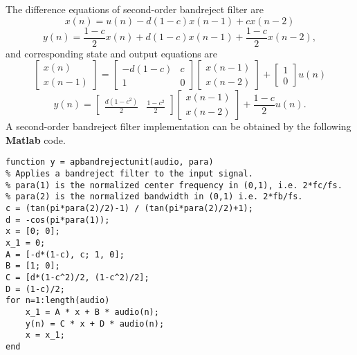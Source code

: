 \documentclass[10pt,a4paper,oneside]{article}
\begin{document}
The difference equations of second-order bandreject filter are
\[
x(n) = u(n) - d(1-c)x(n-1) + cx(n-2)
\]
\[
y(n) = \frac{1-c}{2}x(n) + d(1-c)x(n-1) + \frac{1-c}{2}x(n-2),
\]
and corresponding state and output equations are
\[
\begin{bmatrix}x(n)\\x(n-1)\end{bmatrix} = \begin{bmatrix}
-d(1-c)&c\\
1&0
\end{bmatrix}
\begin{bmatrix}x(n-1)\\x(n-2)\end{bmatrix} + \begin{bmatrix}1\\0\end{bmatrix}
u(n)\]
\[
y(n) = \begin{bmatrix}\frac{d(1-c^2)}{2}&\frac{1-c^2}{2}\end{bmatrix}
\begin{bmatrix}x(n-1)\\x(n-2)\end{bmatrix} + \frac{1-c}{2}u(n).
\]
A second-order bandreject filter implementation can be obtained by the following {\bfseries Matlab} code.
\begin{lstlisting}
function y = apbandrejectunit(audio, para)
% Applies a bandreject filter to the input signal.
% para(1) is the normalized center frequency in (0,1), i.e. 2*fc/fs.
% para(2) is the normalized bandwidth in (0,1) i.e. 2*fb/fs.
c = (tan(pi*para(2)/2)-1) / (tan(pi*para(2)/2)+1);
d = -cos(pi*para(1));
x = [0; 0];
x_1 = 0;
A = [-d*(1-c), c; 1, 0];
B = [1; 0];
C = [d*(1-c^2)/2, (1-c^2)/2];
D = (1-c)/2;
for n=1:length(audio)
	x_1 = A * x + B * audio(n);
	y(n) = C * x + D * audio(n);
	x = x_1;
end
\end{lstlisting}
\end{document}
